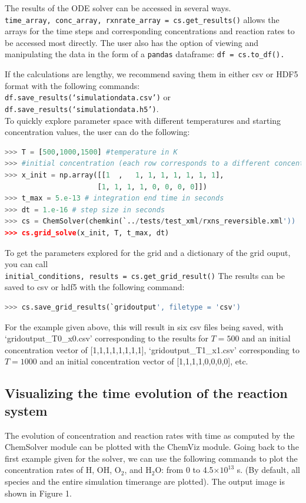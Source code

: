 \documentclass[12pt]{article}
\begin{document}
The results of the ODE solver can be accessed in several ways. \\
\texttt{time\_array, conc\_array, rxnrate\_array = cs.get\_results()}
allows the arrays for the time steps and corresponding concentrations and reaction rates to be accessed most directly. 
The user also has the option of viewing and manipulating the data in the form of a \texttt{pandas} dataframe: \texttt{df = cs.to\_df().}

If the calculations are lengthy, we recommend saving them in either csv or HDF5 format with the following commands:\\
\texttt{df.save\_results(`simulationdata.csv')} or \texttt{df.save\_results(`simulationdata.h5')}. 
\\
To quickly explore parameter space with different temperatures and starting concentration values, the user can do the following: 

\begin{lstlisting}[language = Python, basicstyle = \ttfamily,columns = fullflexible, showstringspaces = False]
>>> T = [500,1000,1500] #temperature in K
>>> #initial concentration (each row corresponds to a different concentration vector)
>>> x_init = np.array([[1  ,   1, 1, 1, 1, 1, 1, 1],
                      [1, 1, 1, 1, 0, 0, 0, 0]]) 
>>> t_max = 5.e-13 # integration end time in seconds
>>> dt = 1.e-16 # step size in seconds
>>> cs = ChemSolver(chemkin(`../tests/test_xml/rxns_reversible.xml'))
>>> cs.grid_solve(x_init, T, t_max, dt)
\end{lstlisting}
To get the parameters explored for the grid and a dictionary of the grid ouput, you can call\\
\texttt{initial\_conditions, results = cs.get\_grid\_result()}
The results can be saved to csv or hdf5 with the following command: 
\begin{lstlisting}[language = Python, basicstyle = \ttfamily,columns = fullflexible, showstringspaces = False]
>>> cs.save_grid_results(`gridoutput', filetype = 'csv')

\end{lstlisting}

For the example given above, this will result in six csv files being saved, with `gridoutput\_T0\_x0.csv' corresponding to the results for $T = 500$ and an initial concentration vector of [1,1,1,1,1,1,1,1], `gridoutput\_T1\_x1.csv' corresponding to $T = 1000$ and an initial concentration vector of [1,1,1,1,0,0,0,0], etc. 

\subsection{Visualizing the time evolution of the reaction system}
The evolution of concentration and reaction rates with time as computed by the ChemSolver module can be plotted with the ChemViz module. Going back to the first example given for the solver, we can use the following commands to plot the concentration rates of H, OH, O$_2$, and H$_2$O: from 0 to 4.5$\times10^{13}$ s. (By default, all species and the entire simulation timerange are plotted). The output image is shown in Figure 1. 
\end{document}

